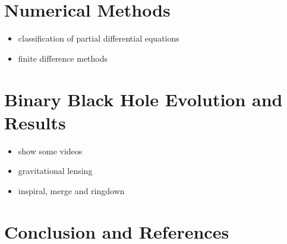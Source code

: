 \documentclass[twocolumn]{article}
\begin{document}
  \section{Numerical Methods} %
  \label{sec:numerical_methods}
    \begin{itemize}
      \item classification of partial differential equations
      \item finite difference methods
    \end{itemize}

  \section{Binary Black Hole Evolution and Results} %
  \label{sec:binary_black_hole_evolution_and_results}
    \begin{itemize}
      \item show some videos
      \item gravitational lensing
      \item inspiral, merge and ringdown
    \end{itemize}

  \section{Conclusion and References} %
  \label{sec:references}


  \nocite{*}
  
  

\end{document}
